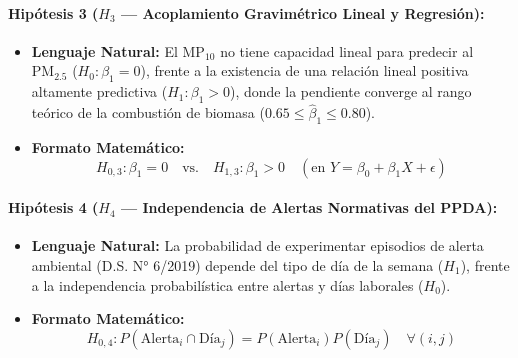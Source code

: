 \documentclass[10pt,twocolumn,a4paper]{article}
\begin{document}
\paragraph{Hipótesis 3 ($H_3$ --- Acoplamiento Gravimétrico Lineal y Regresión):}
\begin{itemize}
    \item \textbf{Lenguaje Natural:} El $\text{MP}_{10}$ no tiene capacidad lineal para predecir al $\text{PM}_{2.5}$ ($H_0: \beta_1 = 0$), frente a la existencia de una relación lineal positiva altamente predictiva ($H_1: \beta_1 > 0$), donde la pendiente converge al rango teórico de la combustión de biomasa ($0.65 \le \hat{\beta}_1 \le 0.80$).
    \item \textbf{Formato Matemático:}
    \begin{equation}
        H_{0,3}: \beta_1 = 0 \quad \text{vs.} \quad H_{1,3}: \beta_1 > 0 \quad (\text{en } Y = \beta_0 + \beta_1 X + \epsilon)
    \end{equation}
\end{itemize}

\paragraph{Hipótesis 4 ($H_4$ --- Independencia de Alertas Normativas del PPDA):}
\begin{itemize}
    \item \textbf{Lenguaje Natural:} La probabilidad de experimentar episodios de alerta ambiental (D.S. N° 6/2019) depende del tipo de día de la semana ($H_1$), frente a la independencia probabilística entre alertas y días laborales ($H_0$).
    \item \textbf{Formato Matemático:}
    \begin{equation}
        H_{0,4}: P(\text{Alerta}_i \cap \text{Día}_j) = P(\text{Alerta}_i)P(\text{Día}_j) \quad \forall (i,j)
    \end{equation}
\end{itemize}
\end{document}
